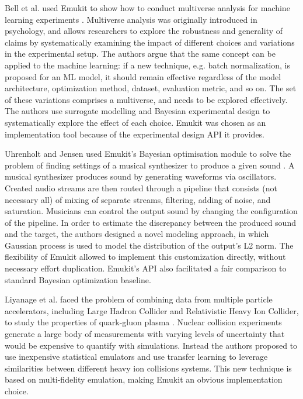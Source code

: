 Bell et al. used Emukit to show how to conduct multiverse analysis for machine learning experiments \cite{bell2022modeling}. Multiverse analysis was originally introduced in psychology, and allows researchers to explore the robustness and generality of claims by systematically examining the impact of different choices and variations in the experimental setup. The authors argue that the same concept can be applied to the machine learning: if a new technique, e.g. batch normalization, is proposed for an ML model, it should remain effective regardless of the model architecture, optimization method, dataset, evaluation metric, and so on. The set of these variations comprises a multiverse, and needs to be explored effectively. The authors use surrogate modelling and Bayesian experimental design to systematically explore the effect of each choice. Emukit was chosen as an implementation tool because of the experimental design API it provides.

Uhrenholt and Jensen used Emukit's Bayesian optimisation module to solve the problem of finding settings of a musical synthesizer to produce a given sound \cite{uhrenholt2019efficient}. A musical synthesizer produces sound by generating waveforms via oscillators. Created audio streams are then routed through a pipeline that consists (not necessary all) of mixing of separate streams, filtering, adding of noise, and saturation. Musicians can control the output sound by changing the configuration of the pipeline. In order to estimate the discrepancy between the produced sound and the target, the authors designed a novel modeling approach, in which Gaussian process is used to model the distribution of the output's L2 norm. The flexibility of Emukit allowed to implement this customization directly, without necessary effort duplication. Emukit's API also facilitated a fair comparison to standard Bayesian optimization baseline.

Liyanage et al. faced the problem of combining data from multiple particle accelerators, including Large Hadron Collider and Relativistic Heavy Ion Collider, to study the properties of quark-gluon plasma \cite{PhysRevC105034910}. Nuclear collision experiments generate a large body of measurements with varying levels of uncertainty that would be expensive to quantify with simulations. Instead the authors proposed to use inexpensive statistical emulators and use transfer learning to leverage similarities between different heavy ion collisions systems. This new technique is based on multi-fidelity emulation, making Emukit an obvious implementation choice.

